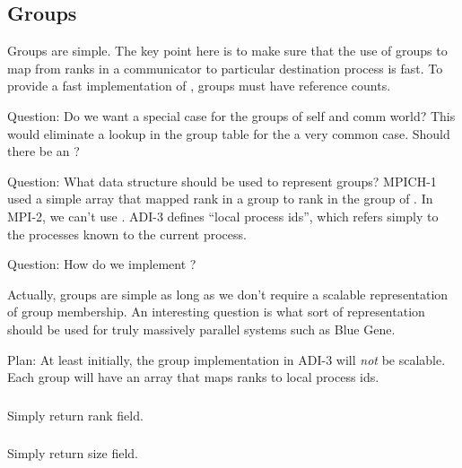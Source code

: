 \documentclass{article}
\begin{document}
\subsection{Groups}

Groups are simple.  The key point here is to make sure that the use of
groups to map from ranks in a communicator to particular destination
process is fast.
To provide a fast implementation of , groups must
have reference counts.  

Question: Do we want a special case for the groups of self and comm
world?  This would eliminate a lookup in the group table for the a very
common case.  Should there be an ?  

Question: What data structure should be used to represent groups?
MPICH-1 used a simple array that mapped rank in a group to rank in the
group of .  In MPI-2, we can't use
.  ADI-3 defines ``local process ids'', which
refers simply to the processes known to the current process.

Question: How do we implement ?

Actually, groups are simple as long as we don't require a scalable
representation of group membership.  An interesting question is what
sort of representation should be used for truly massively parallel
systems such as Blue Gene.  

Plan: At least initially, the group implementation in ADI-3 will \emph{not} be
scalable.  Each group will have an array that maps ranks to local process ids.

\subsubsection{}
Simply return rank field.
\subsubsection{}
Simply return size field.
\end{document}
